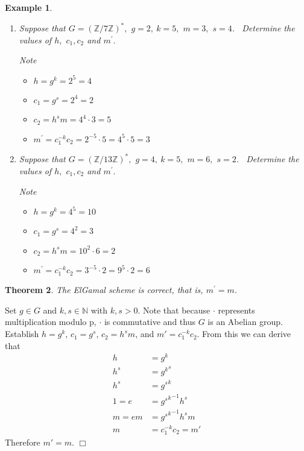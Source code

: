 \documentclass{article}%
\newcommand{\Z}{\mathbb{Z}}
\newtheorem{theorem}{Theorem}
\newtheorem{example}[theorem]{Example}
\newenvironment{proof}{\noindent{\em Proof:}}{$\Box$~\\}
\begin{document}
\begin{example}
\ 

\begin{enumerate}
\item Suppose that $G=(\Z/7\Z)^*,$ $g=2,\ k=5,$ $m=3,$ $s=4$. \ Determine the
values of $h,$ $c_{1},c_{2}$ and $m^{\prime}.$

Note

\begin{itemize}
\item $h=g^{k}=2^{5}=4$

\item $c_{1}=g^{s}=2^{4}=2$

\item $c_{2}=h^{s}m=4^{4}\cdot3=5$

\item $m^{\prime}=c_{1}^{-k}c_{2}=2^{-5}\cdot5=4^{5}\cdot5=3$
\end{itemize}

\item Suppose that $G=(\Z/13\Z)^*,$ $g=4,\ k=5,$ $m=6,$ $s=2$. \ Determine the
values of $h,$ $c_{1},c_{2}$ and $m^{\prime}.$

Note

\begin{itemize}
\item $h=g^{k}=4^5=10$

\item $c_{1}=g^{s}=4^2=3$

\item $c_{2}=h^{s}m=10^2 \cdot6=2$

\item $m^{\prime}=c_{1}^{-k}c_{2}=3^{-5}\cdot2=9^5\cdot 2 =6$
\end{itemize}
\end{enumerate}
\end{example}

\begin{theorem}
The ElGamal scheme is correct, that is, $m^{\prime}=m$.
\end{theorem}

\begin{proof}
Set $g\in G$ and $k,s\in \mathbb{N}$ with $ k,s >0$. Note that because $\cdot$ represents multiplication modulo p, $\cdot$ is commutative and thus $G$ is an Abelian group. Establish $h=g^k$, $c_1=g^s$, $c_2=h^s m$, and $m'=c_1^{-k}c_2$. From this we can derive that
\begin{align*}
    h &= g^k\\
    h^s &= {g^k}^s\\
    h^s &= {g^s}^k\\
    1 = e &= {{g^s}^k}^{-1} h^s \\
    m = em &= {{g^s}^k}^{-1} h^s m \\
    m &= c_1^{-k}c_2 = m'
\end{align*}
Therefore $m'=m$.
\end{proof}
\end{document}
